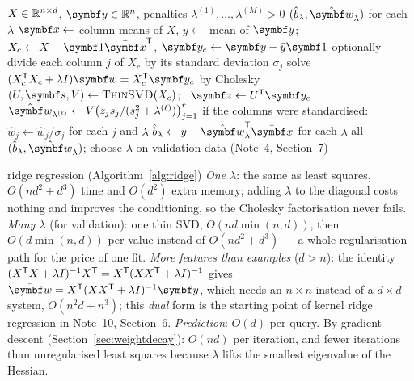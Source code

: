 \documentclass[11pt]{article}
\newcommand{\w}{\vect{w}}
\newcommand{\y}{\vect{y}}
\begin{document}
\begin{algorithm}[htbp]
\caption{Ridge regression, closed form, for one or many values of $\lambda$}
\label{alg:ridge}
\begin{algorithmic}[1]
\Require $X \in \mathbb{R}^{n \times d}$, $\y \in \R^n$, penalties $\lambda^{(1)}, \dots, \lambda^{(M)} > 0$
\Ensure $(\hat b_\lambda, \hat{\w}_\lambda)$ for each $\lambda$
\State $\bar{\x} \gets$ column means of $X$, $\bar y \gets$ mean of $\y$; $X_c \gets X - \vect{1}\bar{\x}\T$, $\y_c \gets \y - \bar y\vect{1}$
\State optionally divide each column $j$ of $X_c$ by its standard deviation $\sigma_j$ 
  \State solve $(X_c\T X_c + \lambda I)\hat{\w} = X_c\T\y_c$ by Cholesky 
\Else
  \State $(U, \vect{s}, V) \gets \Call{ThinSVD}{X_c}$; \ $\vect{z} \gets U\T\y_c$ 
    \State $\hat{\w}_{\lambda^{(\ell)}} \gets V\big(z_j s_j/(s_j^2 + \lambda^{(\ell)})\big)_{j=1}^{r}$ 
  \EndFor
\EndIf
\State if the columns were standardised: $\hat w_j \gets \hat w_j/\sigma_j$ for each $j$ and $\lambda$ 
\State $\hat b_\lambda \gets \bar y - \hat{\w}_\lambda\T\bar{\x}$ for each $\lambda$ 
\State \Return all $(\hat b_\lambda, \hat{\w}_\lambda)$; choose $\lambda$ on validation data (Note~4, Section~7)
\end{algorithmic}
\end{algorithm}

\begin{runtime}{ridge regression (Algorithm~\ref{alg:ridge})}
\emph{One $\lambda$}: the same as least squares, $O(nd^2 + d^3)$ time and $O(d^2)$ extra memory; adding $\lambda$ to the
diagonal costs nothing and improves the conditioning, so the Cholesky factorisation never fails. \emph{Many $\lambda$}
(for validation): one thin SVD, $O(nd\min(n, d))$, then $O(d\min(n, d))$ per value instead of $O(nd^2 + d^3)$ --- a whole regularisation path
for the price of one fit. \emph{More features than examples} ($d > n$): the identity $(X^{\mathsf{T}} X + \lambda I)^{-1}X^{\mathsf{T}} =
X^{\mathsf{T}}(XX^{\mathsf{T}} + \lambda I)^{-1}$ gives $\hat{\w} = X\T(XX\T + \lambda I)^{-1}\y$, which needs an $n \times n$ instead of a
$d \times d$ system, $O(n^2 d + n^3)$; this \emph{dual} form is the starting point of kernel ridge regression in
Note~10, Section~6. \emph{Prediction}: $O(d)$ per query. By gradient descent (Section~\ref{sec:weightdecay}): $O(nd)$ per iteration,
and fewer iterations than unregularised least squares because $\lambda$ lifts the smallest eigenvalue of the Hessian.
\end{runtime}
\end{document}
